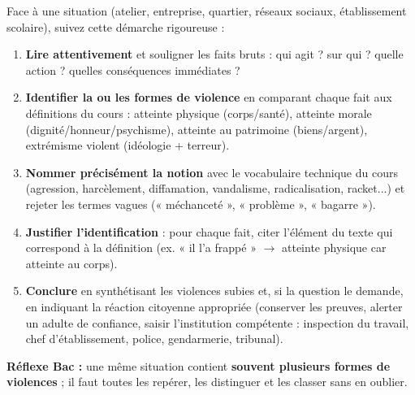 \documentclass[11pt]{article}
\newcommand{\cle}[1]{{\popxbold\color{popdark}#1}}
\begin{document}
\begin{methode}
Face à une situation (atelier, entreprise, quartier, réseaux sociaux, établissement scolaire), suivez cette démarche rigoureuse :
\begin{enumerate}
\item \textbf{Lire attentivement} et souligner les faits bruts : qui agit ? sur qui ? quelle action ? quelles conséquences immédiates ?
\item \textbf{Identifier la ou les formes de violence} en comparant chaque fait aux définitions du cours : atteinte physique (corps/santé), atteinte morale (dignité/honneur/psychisme), atteinte au patrimoine (biens/argent), extrémisme violent (idéologie + terreur).
\item \textbf{Nommer précisément la notion} avec le vocabulaire technique du cours (\cle{agression}, \cle{harcèlement}, \cle{diffamation}, \cle{vandalisme}, \cle{radicalisation}, \cle{racket}...) et rejeter les termes vagues (« méchanceté », « problème », « bagarre »).
\item \textbf{Justifier l'identification} : pour chaque fait, citer l'élément du texte qui correspond à la définition (ex. « il l'a frappé » $\rightarrow$ atteinte physique car atteinte au corps).
\item \textbf{Conclure} en synthétisant les violences subies et, si la question le demande, en indiquant la réaction citoyenne appropriée (conserver les preuves, alerter un adulte de confiance, saisir l'institution compétente : inspection du travail, chef d'établissement, police, gendarmerie, tribunal).
\end{enumerate}
\textbf{Réflexe Bac :} une même situation contient \textbf{souvent plusieurs formes de violences} ; il faut toutes les repérer, les distinguer et les classer sans en oublier.
\end{methode}
\end{document}
